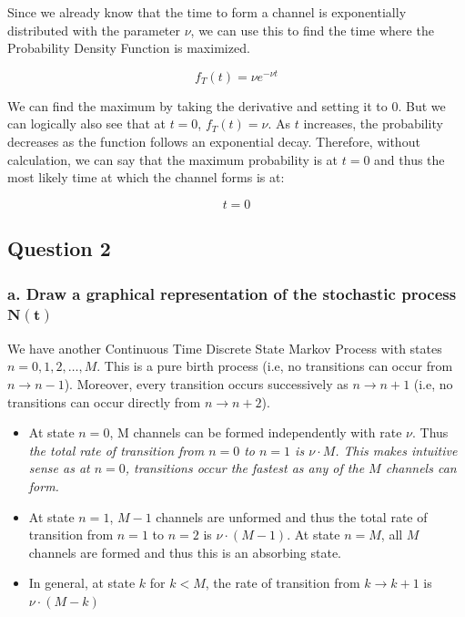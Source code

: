 \documentclass{article}
\begin{document}
Since we already know that the time to form a channel is exponentially
distributed with the parameter $\nu$, we can use this to find the time where
the Probability Density Function is maximized.

\[
    f_{T}(t) = \nu e^{-\nu t}
\]

We can find the maximum by taking the derivative and setting it to 0. But we
can logically also see that at $t = 0$, $f_{T}(t) = \nu$. As $t$ increases, the
probability decreases as the function follows an exponential decay. Therefore,
without calculation, we can say that the maximum probability is at $t = 0$ and
thus the most likely time at which the channel forms is at:

\begin{equation}
    \boxed{t = 0}
\end{equation}

\newpage
\subsection*{Question 2}
\subsubsection*{a. Draw a graphical representation of the stochastic process $\mathbf{N(t)}$}
We have another Continuous Time Discrete State Markov Process with states $n = 0, 1, 2, \ldots, M$. This is a pure birth process (i.e, no transitions can occur from $n \rightarrow n-1$). Moreover, every transition occurs successively as $n \rightarrow n+1$ (i.e, no transitions can occur directly from $n \rightarrow n+2$).

\begin{itemize}
    \item At state $n = 0$, M channels can be formed independently with rate $\nu$. Thus
          \textit{the total rate of transition from $n = 0$ to $n = 1$ is $\nu \cdot M$.
              This makes intuitive sense as at $n=0$, transitions occur the fastest as any of
              the $M$ channels can form.}
    \item At state $n = 1$, $M-1$ channels are unformed and thus the total rate of
          transition from $n = 1$ to $n = 2$ is $ \nu \cdot (M-1)$. At state $n = M$, all
          $M$ channels are formed and thus this is an absorbing state.
    \item In general, at state $k$ for $k < M$, the rate of transition from $k
              \rightarrow k+1$ is $\nu \cdot (M-k)$
\end{itemize}
\end{document}
